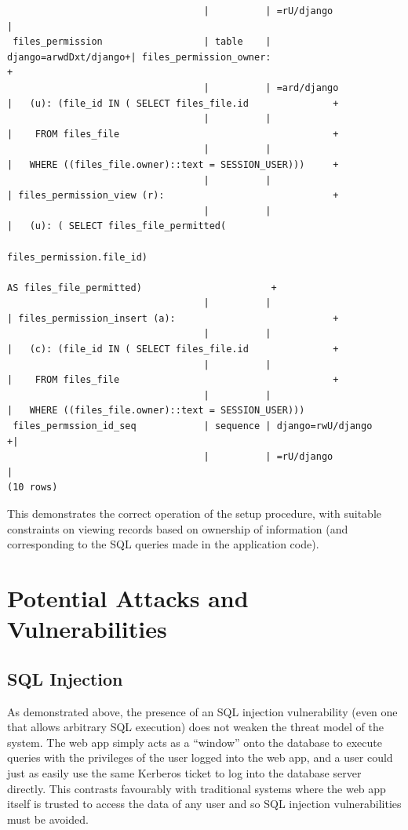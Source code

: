 \documentclass[12pt]{report}
\begin{document}
\begin{landscape}
{\begin{verbatim}
                                   |          | =rU/django            |
 files_permission                  | table    | django=arwdDxt/django+| files_permission_owner:                                 +
                                   |          | =ard/django           |   (u): (file_id IN ( SELECT files_file.id               +
                                   |          |                       |    FROM files_file                                      +
                                   |          |                       |   WHERE ((files_file.owner)::text = SESSION_USER)))     +
                                   |          |                       | files_permission_view (r):                              +
                                   |          |                       |   (u): ( SELECT files_file_permitted(
                                                                                 files_permission.file_id)
                                                                                 AS files_file_permitted)                       +
                                   |          |                       | files_permission_insert (a):                            +
                                   |          |                       |   (c): (file_id IN ( SELECT files_file.id               +
                                   |          |                       |    FROM files_file                                      +
                                   |          |                       |   WHERE ((files_file.owner)::text = SESSION_USER)))
 files_permssion_id_seq            | sequence | django=rwU/django    +|
                                   |          | =rU/django            |
(10 rows)
\end{verbatim}
  }

  This demonstrates the correct operation of the setup procedure, with suitable constraints on viewing records based on ownership of information (and corresponding to the SQL queries made in the application code).

\end{landscape}

\section{Potential Attacks and Vulnerabilities}

\subsection{SQL Injection}
As demonstrated above, the presence of an SQL injection vulnerability (even one that allows arbitrary SQL execution) does not weaken the threat model of the system. The web app simply acts as a ``window'' onto the database to execute queries with the privileges of the user logged into the web app, and a user could just as easily use the same Kerberos ticket to log into the database server directly. This contrasts favourably with traditional systems where the web app itself is trusted to access the data of any user and so SQL injection vulnerabilities must be avoided.
\end{document}
